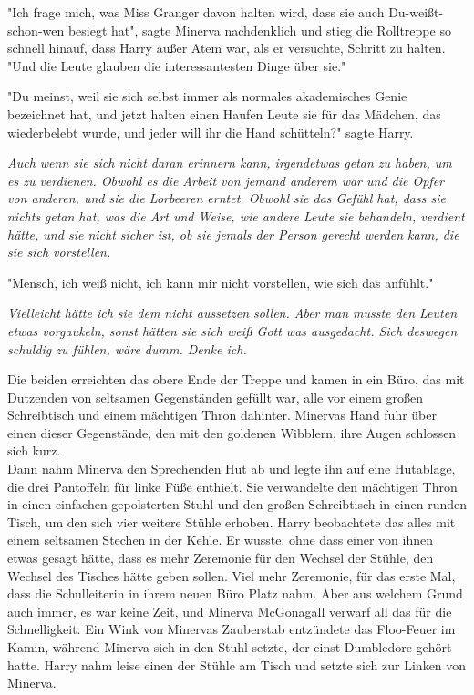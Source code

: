 {"Ich frage mich, was Miss Granger davon halten wird, dass sie auch Du-weißt-schon-wen besiegt hat", sagte Minerva nachdenklich und stieg die Rolltreppe so schnell hinauf, dass Harry außer Atem war, als er versuchte, Schritt zu halten.\\ "Und die Leute glauben die interessantesten Dinge über sie."

"Du meinst, weil sie sich selbst immer als normales akademisches Genie bezeichnet hat, und jetzt halten einen Haufen Leute sie für das Mädchen, das wiederbelebt wurde, und jeder will ihr die Hand schütteln?" sagte Harry.

\emph{Auch wenn sie sich nicht daran erinnern kann, irgendetwas getan zu haben, um es zu verdienen. Obwohl es die Arbeit von jemand anderem war und die Opfer von anderen, und sie die Lorbeeren erntet. Obwohl sie das Gefühl hat, dass sie nichts} \emph{getan hat, was die Art und Weise, wie andere Leute sie behandeln, verdient hätte, und sie nicht sicher ist, ob sie jemals der Person gerecht werden kann, die sie sich vorstellen.}

"Mensch, ich weiß nicht, ich kann mir nicht vorstellen, wie sich das anfühlt."

\emph{Vielleicht hätte ich sie dem nicht aussetzen sollen. Aber man musste den Leuten etwas vorgaukeln, sonst hätten sie sich weiß Gott was ausgedacht. Sich deswegen schuldig zu fühlen, wäre dumm. Denke ich.}

Die beiden erreichten das obere Ende der Treppe und kamen in ein Büro, das mit Dutzenden von seltsamen Gegenständen gefüllt war, alle vor einem großen Schreibtisch und einem mächtigen Thron dahinter. Minervas Hand fuhr über einen dieser Gegenstände, den mit den goldenen Wibblern, ihre Augen schlossen sich kurz.\\ Dann nahm Minerva den Sprechenden Hut ab und legte ihn auf eine Hutablage, die drei Pantoffeln für linke Füße enthielt. Sie verwandelte den mächtigen Thron in einen einfachen gepolsterten Stuhl und den großen Schreibtisch in einen runden Tisch, um den sich vier weitere Stühle erhoben. Harry beobachtete das alles mit einem seltsamen Stechen in der Kehle. Er wusste, ohne dass einer von ihnen etwas gesagt hätte, dass es mehr Zeremonie für den Wechsel der Stühle, den Wechsel des Tisches hätte geben sollen. Viel mehr Zeremonie, für das erste Mal, dass die Schulleiterin in ihrem neuen Büro Platz nahm. Aber aus welchem Grund auch immer, es war keine Zeit, und Minerva McGonagall verwarf all das für die Schnelligkeit. Ein Wink von Minervas Zauberstab entzündete das Floo-Feuer im Kamin, während Minerva sich in den Stuhl setzte, der einst Dumbledore gehört hatte. Harry nahm leise einen der Stühle am Tisch und setzte sich zur Linken von Minerva.

}
